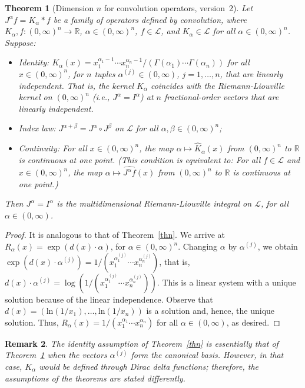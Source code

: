 \documentclass[12pt,reqno]{amsart}
\theoremstyle{plain}
\newtheorem{theorem}{Theorem}[section] %
\newtheorem{remark}[theorem]{Remark}
\numberwithin{equation}{section} %
\begin{document}
\begin{theorem}[Dimension $n$ for convolution operators, version~2] \label{thn22}
Let $J^\alpha f=K_\alpha\ast f$ be a family of operators defined by convolution, where $K_\alpha,f:(0,\infty)^n\rightarrow\mathbb{R}$, $\alpha\in (0,\infty)^n$, $f\in\mathcal{L}$, and $K_\alpha \in\mathcal{L}$ for all $\alpha\in (0,\infty)^n$. Suppose: 
\begin{itemize}
\item Identity: $K_\alpha(x)=x_1^{\alpha_1-1}\cdots x_n^{\alpha_n-1}/(\Gamma(\alpha_1)\cdots\Gamma(\alpha_n))$ for all $x\in(0,\infty)^n$, for $n$ tuples $\alpha^{(j)}\in (0,\infty)$, $j=1,\ldots,n$, that are linearly independent. That is, the kernel $K_\alpha$ coincides with the Riemann-Liouville kernel on $(0,\infty)^n$ (i.e., $J^\alpha=I^\alpha$) at $n$ fractional-order vectors that are linearly independent. 
\item Index law: $J^{\alpha+\beta}=J^\alpha\circ J^\beta$ on $\mathcal{L}$ for all $\alpha,\beta\in (0,\infty)^n$; 
\item Continuity: For all $x\in (0,\infty)^n$, the map $\alpha\mapsto \widehat{K}_\alpha(x)$ from $(0,\infty)^n$ to $\mathbb{R}$ is continuous at one point. (This condition is equivalent to: For all $f\in\mathcal{L}$ and $x\in (0,\infty)^n$, the map $\alpha\mapsto \widehat{J^{\alpha}f}(x)$ from $(0,\infty)^n$ to $\mathbb{R}$ is continuous at one point.)
\end{itemize}
Then $J^\alpha=I^\alpha$ is the multidimensional Riemann-Liouville integral on $\mathcal{L}$, for all $\alpha\in (0,\infty)$. 
\end{theorem}
\begin{proof}
It is analogous to that of Theorem~\ref{thn}. We arrive at $R_\alpha(x)=\exp(d(x)\cdot \alpha)$, for $\alpha\in (0,\infty)^n$. Changing $\alpha$ by $\alpha^{(j)}$, we obtain $\exp(d(x)\cdot \alpha^{(j)})=1/(x_1^{\alpha_1^{(j)}}\cdots x_n^{\alpha_n^{(j)}})$, that is, $d(x)\cdot \alpha^{(j)}=\log(1/(x_1^{\alpha_1^{(j)}}\cdots x_n^{\alpha_n^{(j)}}))$. This is a linear system with a unique solution because of the linear independence. Observe that $d(x)=(\mathrm{ln}(1/x_1),\ldots,\mathrm{ln}(1/x_n))$ is a solution and, hence, the unique solution. Thus, $R_\alpha(x)=1/(x_1^{\alpha_1}\cdots x_n^{\alpha_n})$ for all $\alpha\in (0,\infty)$, as desired.
\end{proof}

\begin{remark} \normalfont
The identity assumption of Theorem~\ref{thn} is essentially that of Theorem~\ref{thn22} when the vectors $\alpha^{(j)}$ form the canonical basis. However, in that case, $K_\alpha$ would be defined through Dirac delta functions; therefore, the assumptions of the theorems are stated differently.
\end{remark}
\end{document}
